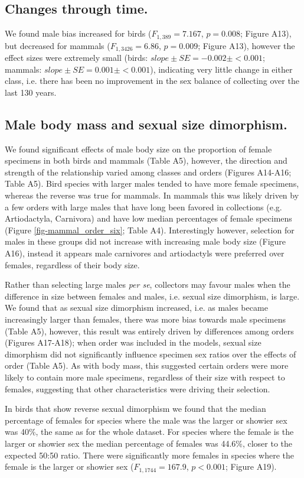 \documentclass[a4paper, 12pt]{article}
\begin{document}
\subsection{Changes through time.}
We found male bias increased for birds ($F_{1, 389} = 7.167$, $p = 0.008$; Figure A13), but decreased for mammals ($F_{1, 3426} = 6.86$, $p = 0.009$; Figure A13), however the effect sizes were extremely small (birds: $slope \pm SE = -0.002 \pm < 0.001$; mammals: $slope \pm SE = 0.001 \pm < 0.001$), indicating very little change in either class, i.e. there has been no improvement in the sex balance of collecting over the last 130 years.

\subsection{Male body mass and sexual size dimorphism.}
We found significant effects of male body size on the proportion of female specimens in both birds and mammals (Table A5), however, the direction and strength of the relationship varied among classes and orders (Figures A14-A16; Table A5).
Bird species with larger males tended to have more female specimens, whereas the reverse was true for mammals. 
In mammals this was likely driven by a few orders with large males that have long been favored in collections (e.g. Artiodactyla, Carnivora) and have low median percentages of female specimens (Figure \ref{fig-mammal_order_six}; Table A4). 
Interestingly however, selection for males in these groups did not increase with increasing male body size (Figure A16), instead it appears male carnivores and artiodactyls were preferred over females, regardless of their body size.

Rather than selecting large males \textit{per se}, collectors may favour males when the difference in size between females and males, i.e. sexual size dimorphism, is large. 
We found that as sexual size dimorphism increased, i.e. as males became increasingly larger than females, there was more bias towards male specimens (Table A5), however, this result was entirely driven by differences among orders (Figures A17-A18); when order was included in the models, sexual size dimorphism did not significantly influence specimen sex ratios over the effects of order (Table A5). 
As with body mass, this suggested certain orders were more likely to contain more male specimens, regardless of their size with respect to females, suggesting that other characteristics were driving their selection.

In birds that show reverse sexual dimorphism we found that the median percentage of females for species where the male was the larger or showier sex was 40\%, the same as for the whole dataset. 
For species where the female is the larger or showier sex the median percentage of females was 44.6\%, closer to the expected 50:50 ratio.
 There were significantly more females in species where the female is the larger or showier sex ($F_{1, 1744} = 167.9$, $p < 0.001$; Figure A19).
\end{document}
